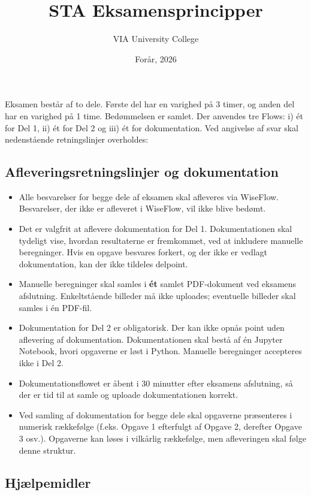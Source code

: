 \documentclass[11pt,english]{article}
\title{STA Eksamensprincipper}
\author{VIA University College}
\date{Forår, 2026}
\begin{document}
\maketitle

\thispagestyle{empty}

Eksamen består af to dele. Første del har en varighed på 3 timer, og anden del har en varighed på 1 time. Bedømmelsen er samlet. Der anvendes tre Flows: i) ét for Del 1, ii) ét for Del 2 og iii) ét for dokumentation. Ved angivelse af svar skal nedenstående retningslinjer overholdes:

\subsection*{Afleveringsretningslinjer og dokumentation}

\begin{itemize}
    \item Alle besvarelser for begge dele af eksamen skal afleveres via WiseFlow. Besvarelser, der ikke er afleveret i WiseFlow, vil ikke blive bedømt.
    \item Det er valgfrit at aflevere dokumentation for Del 1. Dokumentationen skal tydeligt vise, hvordan resultaterne er fremkommet, ved at inkludere manuelle beregninger. Hvis en opgave besvares forkert, og der ikke er vedlagt dokumentation, kan der ikke tildeles delpoint.
    \item Manuelle beregninger skal samles i \textbf{ét} samlet PDF-dokument ved eksamens afslutning. Enkeltstående billeder må ikke uploades; eventuelle billeder skal samles i én PDF-fil.
    \item Dokumentation for Del 2 er obligatorisk. Der kan ikke opnås point uden aflevering af dokumentation. Dokumentationen skal bestå af én Jupyter Notebook, hvori opgaverne er løst i Python. Manuelle beregninger accepteres ikke i Del 2.
    \item Dokumentationsflowet er åbent i 30 minutter efter eksamens afslutning, så der er tid til at samle og uploade dokumentationen korrekt.
    \item Ved samling af dokumentation for begge dele skal opgaverne præsenteres i numerisk rækkefølge (f.eks. Opgave 1 efterfulgt af Opgave 2, derefter Opgave 3 osv.). Opgaverne kan løses i vilkårlig rækkefølge, men afleveringen skal følge denne struktur.
\end{itemize}

\subsection*{Hjælpemidler}
\end{document}
